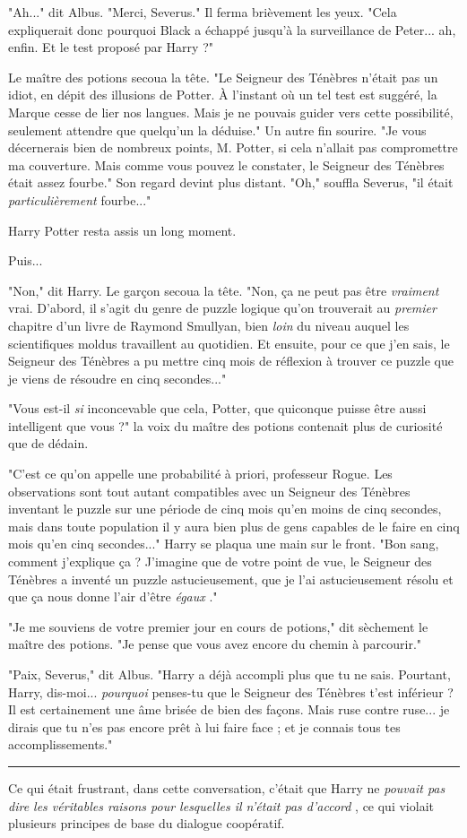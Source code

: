 "Ah..." dit Albus. "Merci, Severus." Il ferma brièvement les yeux. "Cela expliquerait donc pourquoi Black a échappé jusqu'à la surveillance de Peter... ah, enfin. Et le test proposé par Harry ?"

Le maître des potions secoua la tête. "Le Seigneur des Ténèbres n'était pas un idiot, en dépit des illusions de Potter. À l'instant où un tel test est suggéré, la Marque cesse de lier nos langues. Mais je ne pouvais guider vers cette possibilité, seulement attendre que quelqu'un la déduise." Un autre fin sourire. "Je vous décernerais bien de nombreux points, M. Potter, si cela n'allait pas compromettre ma couverture. Mais comme vous pouvez le constater, le Seigneur des Ténèbres était assez fourbe." Son regard devint plus distant. "Oh," souffla Severus, "il était \emph{particulièrement}  fourbe..."

Harry Potter resta assis un long moment.

Puis...

"Non," dit Harry. Le garçon secoua la tête. "Non, ça ne peut pas être \emph{vraiment}  vrai. D'abord, il s'agit du genre de puzzle logique qu'on trouverait au \emph{premier } chapitre d'un livre de Raymond Smullyan, bien \emph{loin}  du niveau auquel les scientifiques moldus travaillent au quotidien. Et ensuite, pour ce que j'en sais, le Seigneur des Ténèbres a pu mettre cinq mois de réflexion à trouver ce puzzle que je viens de résoudre en cinq secondes..."

"Vous est-il \emph{si}  inconcevable que cela, Potter, que quiconque puisse être aussi intelligent que vous ?" la voix du maître des potions contenait plus de curiosité que de dédain.

"C'est ce qu'on appelle une probabilité à priori, professeur Rogue. Les observations sont tout autant compatibles avec un Seigneur des Ténèbres inventant le puzzle sur une période de cinq mois qu'en moins de cinq secondes, mais dans toute population il y aura bien plus de gens capables de le faire en cinq mois qu'en cinq secondes..." Harry se plaqua une main sur le front. "Bon sang, comment j'explique ça ? J'imagine que de votre point de vue, le Seigneur des Ténèbres a inventé un puzzle astucieusement, que je l'ai astucieusement résolu et que ça nous donne l'air d'être \emph{égaux} ."

"Je me souviens de votre premier jour en cours de potions," dit sèchement le maître des potions. "Je pense que vous avez encore du chemin à parcourir."

"Paix, Severus," dit Albus. "Harry a déjà accompli plus que tu ne sais. Pourtant, Harry, dis-moi... \emph{pourquoi}  penses-tu que le Seigneur des Ténèbres t'est inférieur ? Il est certainement une âme brisée de bien des façons. Mais ruse contre ruse... je dirais que tu n'es pas encore prêt à lui faire face ; et je connais tous tes accomplissements."
\par\noindent\rule{\textwidth}{0.4pt}
Ce qui était frustrant, dans cette conversation, c'était que Harry ne \emph{pouvait pas dire les véritables raisons pour lesquelles il n'était pas d'accord} , ce qui violait plusieurs principes de base du dialogue coopératif.


